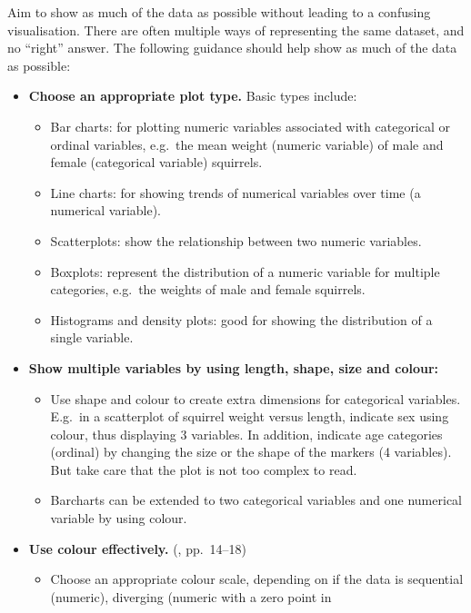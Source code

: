 \documentclass[10pt]{article}
\begin{document}
\begin{multicols}{3}
Aim to show as much of the data as possible without leading to a
confusing visualisation. There are often multiple ways of representing
the same dataset, and no ``right'' answer. The following guidance
should help show as much of the data as possible:
\begin{itemize}
\item \textbf{Choose an appropriate plot type.} Basic types include:
  \begin{itemize}
  \item Bar charts: for plotting numeric variables associated with
    categorical or ordinal variables, e.g.~the mean weight
    (numeric variable) of male and female (categorical variable)
    squirrels.
  \item Line charts: for showing trends of numerical variables over
    time (a numerical variable).
  \item Scatterplots: show the relationship between two numeric
    variables.
  \item Boxplots: represent the distribution of a numeric variable for
    multiple categories, e.g.~the weights of male and female
    squirrels.
  \item Histograms and density plots: good for showing the
    distribution of a single variable.
  \end{itemize}
\item \textbf{Show multiple variables by using length, shape, size and colour:}
  \begin{itemize}
  \item Use shape and colour to create extra dimensions for
    categorical variables. E.g.~in a scatterplot of squirrel weight
    versus length, indicate sex using colour, thus displaying 3
    variables. In addition, indicate age categories (ordinal) by
    changing the size or the shape of the markers (4 variables).
    But take care that the plot is not too complex to read.
  \item Barcharts can be extended to two categorical variables and one
    numerical variable by using colour.
  \end{itemize}
\item \textbf{Use colour effectively.} (\citealp{WexlEtal17big}, pp.~14--18)
  \begin{itemize}
  \item Choose an appropriate colour scale, depending on if the data
    is sequential (numeric), diverging (numeric with a zero point in

\end{itemize}
\end{itemize}
\end{multicols}
\end{document}
